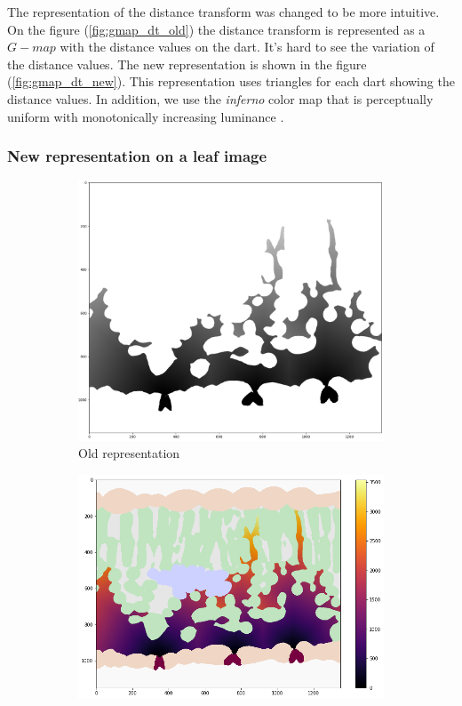 The representation of the distance transform was changed to be more intuitive. On
the figure (\ref{fig:gmap_dt_old}) the distance transform is represented as a
$G-map$ with the distance values on the dart. It's hard to see the variation of the
distance values. The new representation is shown in the figure (\ref{fig:gmap_dt_new}).
This representation uses triangles for each dart showing the distance values. In
addition, we use the \textit{inferno} color map that is perceptually uniform with 
monotonically increasing luminance \cite{Moreland}.

\subsubsection{New representation on a leaf image}

\begin{figure}
    \centering
    \begin{subfigure}{0.45\textwidth}
        \centering
        \includegraphics[width=\textwidth]{figures/leaf_dt_old.png}
        \caption{Old representation}
        \label{fig:leaf_dt_old}
    \end{subfigure}
    \hfill
    \begin{subfigure}{0.54\textwidth}
        \centering
        \includegraphics[width=\textwidth]{figures/leaf_dt_new.png}

\end{subfigure}
\end{figure}
